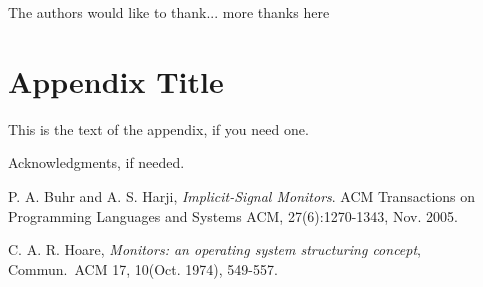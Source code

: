 \documentclass[preprint]{sigplanconf}
\begin{document}
The authors would like to thank...
more thanks here








\appendix
\section{Appendix Title}

This is the text of the appendix, if you need one.

\acks

Acknowledgments, if needed.





\begin{thebibliography}{}
\softraggedright

  P. A. Buhr and A. S. Harji, \emph{Implicit-Signal Monitors}. ACM 
  Transactions on Programming Languages and Systems ACM, 27(6):1270-1343, 
  Nov. 2005.

  C. A. R. Hoare, \emph{Monitors: an operating system structuring concept}, 
  Commun.~ACM 17, 10(Oct. 1974), 549-557.



\end{thebibliography}
\end{document}
